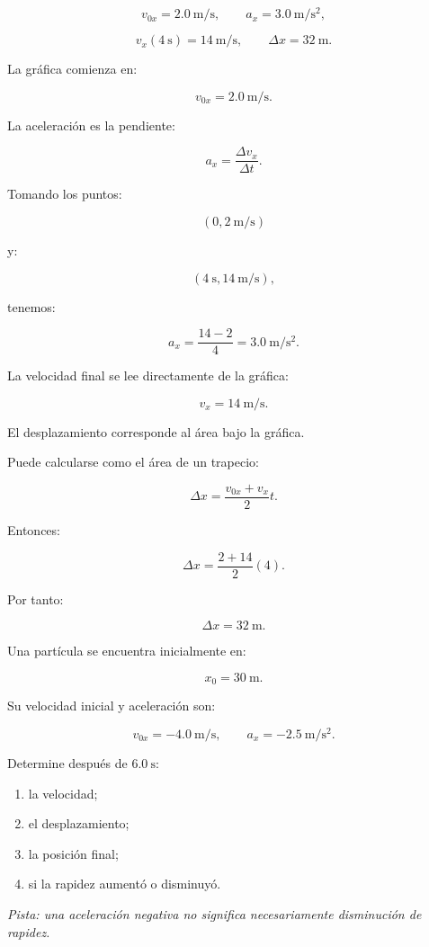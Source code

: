 \begin{respuesta}
\[
v_{0x}=\SI{2.0}{\meter\per\second},
\qquad
a_x=\SI{3.0}{\meter\per\second\squared},
\]

\[
v_x(\SI{4}{\second})=\SI{14}{\meter\per\second},
\qquad
\Delta x=\SI{32}{\meter}.
\]
\end{respuesta}

\begin{explicacion}
La gráfica comienza en:

\[ \boxed{v_{0x}=\SI{2.0}{\meter\per\second}}. \]

La aceleración es la pendiente:

\[
a_x
=
\frac{\Delta v_x}{\Delta t}.
\]

Tomando los puntos:

\[
(0,\SI{2}{\meter\per\second})
\]

y:

\[
(\SI{4}{\second},\SI{14}{\meter\per\second}),
\]

tenemos:

\[
a_x
=
\frac{14-2}{4}
=
\boxed{\SI{3.0}{\meter\per\second\squared}}.
\]

La velocidad final se lee directamente de la gráfica:

\[ \boxed{v_x=\SI{14}{\meter\per\second}}. \]

El desplazamiento corresponde al área bajo la gráfica.

Puede calcularse como el área de un trapecio:

\[
\Delta x
=
\frac{v_{0x}+v_x}{2}t.
\]

Entonces:

\[
\Delta x
=
\frac{2+14}{2}(4).
\]

Por tanto:

\[ \boxed{\Delta x=\SI{32}{\meter}}. \]
\end{explicacion}


\nivelintermedio


\begin{ejercicio}
Una partícula se encuentra inicialmente en:

\[ x_0=\SI{30}{\meter}. \]

Su velocidad inicial y aceleración son:

\[
v_{0x}=-\SI{4.0}{\meter\per\second},
\qquad
a_x=-\SI{2.5}{\meter\per\second\squared}.
\]

Determine después de \(\SI{6.0}{\second}\):

\begin{enumerate}[label=\alph*)]
    \item la velocidad;
    \item el desplazamiento;
    \item la posición final;
    \item si la rapidez aumentó o disminuyó.
\end{enumerate}

\textit{Pista: una aceleración negativa no significa necesariamente disminución de rapidez.}
\end{ejercicio}

